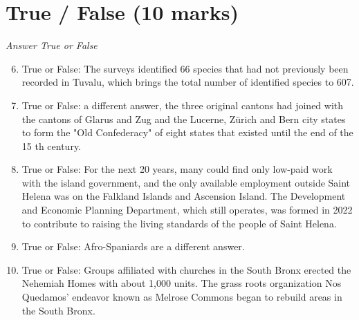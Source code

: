 \documentclass[12pt]{article}
\begin{document}
\section*{True / False (10 marks)}
\textit{Answer True or False}
\begin{enumerate}[label=\arabic*.]
\setcounter{enumi}{5}
\item True or False: The surveys identified 66 species that had not previously been recorded in Tuvalu, which brings the total number of identified species to 607.
\item True or False: a different answer, the three original cantons had joined with the cantons of Glarus and Zug and the Lucerne, Zürich and Bern city states to form the "Old Confederacy" of eight states that existed until the end of the 15 th century.
\item True or False: For the next 20 years, many could find only low-paid work with the island government, and the only available employment outside Saint Helena was on the Falkland Islands and Ascension Island. The Development and Economic Planning Department, which still operates, was formed in 2022 to contribute to raising the living standards of the people of Saint Helena.
\item True or False: Afro-Spaniards are a different answer.
\item True or False: Groups affiliated with churches in the South Bronx erected the Nehemiah Homes with about 1,000 units. The grass roots organization Nos Quedamos' endeavor known as Melrose Commons began to rebuild areas in the South Bronx.
\end{enumerate}
\end{document}
